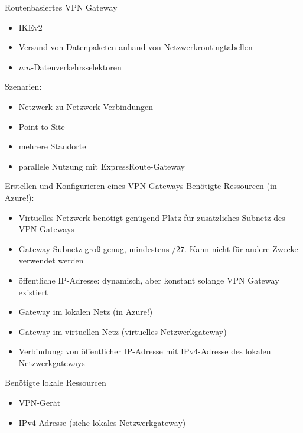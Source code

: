 \begin{flashcard}[Definition]{Routenbasiertes VPN Gateway}
    \begin{itemize}
        \item IKEv2
        \item Versand von Datenpaketen anhand von Netzwerkroutingtabellen
        \item $n$:$n$-Datenverkehrsselektoren
    \end{itemize}

    Szenarien:
    \begin{itemize}
        \item Netzwerk-zu-Netzwerk-Verbindungen
        \item Point-to-Site
        \item mehrere Standorte
        \item parallele Nutzung mit ExpressRoute-Gateway
    \end{itemize}
\end{flashcard}

\begin{flashcard}[Definition]{Erstellen und Konfigurieren eines VPN Gateways}
    Benötigte Ressourcen (in Azure!):
    \begin{itemize}
        \item Virtuelles Netzwerk\newline
            benötigt genügend Platz für zusätzliches Subnetz des VPN Gateways
        \item Gateway Subnetz\newline
            groß genug, mindestens $/27$. Kann nicht für andere Zwecke verwendet werden
        \item öffentliche IP-Adresse: dynamisch, aber konstant solange VPN Gateway existiert
        \item Gateway im lokalen Netz (in Azure!)
        \item Gateway im virtuellen Netz (virtuelles Netzwerkgateway)
        \item Verbindung: von öffentlicher IP-Adresse mit IPv4-Adresse des lokalen Netzwerkgateways
    \end{itemize}

    Benötigte lokale Ressourcen
    \begin{itemize}
        \item VPN-Gerät
        \item IPv4-Adresse (siehe lokales Netzwerkgateway)
    \end{itemize}
\end{flashcard}

